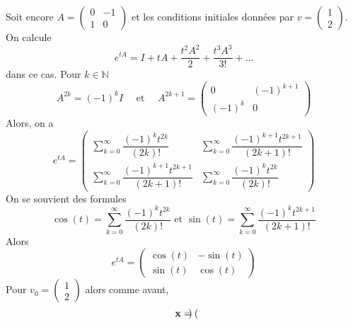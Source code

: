 \begin{example} 
  Soit encore 
  $A =
  \begin{pmatrix}
    0 & -1\\
    1 & 0
  \end{pmatrix}$ et les conditions initiales données par $v =  \left(\begin{smallmatrix}
    1\\2
  \end{smallmatrix}\right)$.
  On calcule 
  \begin{displaymath}
    e^{tA} =  I+tA+\dfrac{t^{2}A^{2}}{2}+\dfrac{t^{3}A^{3}}{3!}+\dots 
  \end{displaymath}
dans ce cas. 
Pour  $k∈ ℕ$ 
\begin{displaymath}
  A^{2k}=(-1)^{k} I  \quad \text{ et } \quad  A^{2k+1}=
\begin{pmatrix}
    0 & (-1)^{k+1}\\
    (-1)^{k} & 0
\end{pmatrix} 
\end{displaymath}
Alors, on a 
\begin{displaymath} 
  e^{tA} = 
  \begin{pmatrix} \displaystyle 
     \sum_{k=0}^{\infty}\dfrac{(-1)^{k}t^{2k}}{(2k)!} &  \displaystyle \sum_{k=0}^{\infty}\dfrac{(-1)^{k+1}t^{2k+1}}{(2k+1)!}\\
    \displaystyle \sum_{k=0}^{\infty}\dfrac{(-1)^{k+1}t^{2k+1}}{(2k+1)!} & \displaystyle \sum_{k=0}^{\infty}\dfrac{(-1)^{k}t^{2k}}{(2k)!}
\end{pmatrix}
\end{displaymath}
On se souvient des formules 
\begin{displaymath}
  \cos(t) =\displaystyle \sum_{k=0}^{\infty}\dfrac{(-1)^{k}t^{2k}}{(2k)!} \text{ et }\sin(t) =\displaystyle \sum_{k=0}^{\infty}\dfrac{(-1)^{k}t^{2k+1}}{(2k+1)!} 
\end{displaymath}
Alors
\begin{displaymath}
  e^{tA} = \begin{pmatrix}
    \cos(t)&-\sin(t)\\
    \sin(t)&\cos(t)
  \end{pmatrix}
\end{displaymath}
Pour  $v_0 = 
\begin{pmatrix}
    1\\
    2
\end{pmatrix} $ 
alors comme avant, 
\begin{displaymath}
  \mathbf{x} = \begin{pmatrix}

\end{pmatrix}
\end{displaymath}
\end{example}
